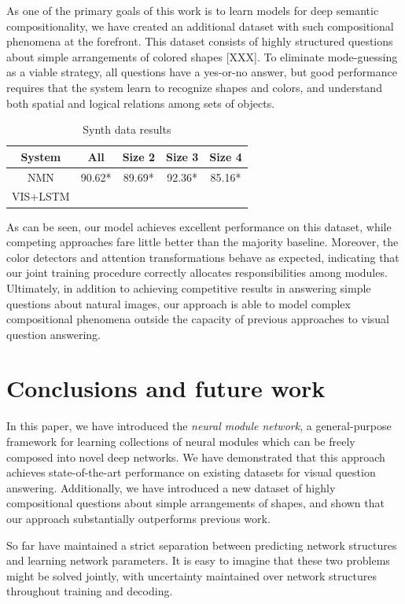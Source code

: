 \documentclass[10pt,twocolumn,letterpaper]{article}
\begin{document}
As one of the primary goals of this work is to learn models for deep semantic compositionality, we have created an additional dataset with such compositional phenomena at the forefront. This dataset consists of highly structured questions about simple arrangements of colored shapes [XXX]. To eliminate mode-guessing as a viable strategy, all questions have a yes-or-no answer, but good performance requires that the system learn to recognize shapes and colors, and understand both spatial and logical relations among sets of objects.


\begin{table}[h]
  \footnotesize
  \center
  \begin{tabular}{ccccc}
    \toprule
    System & All & Size 2 & Size 3 & Size 4 \\
    \midrule
    NMN & 90.62* & 89.69* & 92.36* & 85.16* \\
    VIS+LSTM &  \\
    \bottomrule
  \end{tabular}
  \caption{Synth data results}
\end{table}

As can be seen, our model achieves excellent performance on this dataset, while competing approaches fare little better than the majority baseline. Moreover, the color detectors and attention transformations behave as expected, indicating that our joint training procedure correctly allocates responsibilities among modules. Ultimately, in addition to achieving competitive results in answering simple questions about natural images, our approach is able to model complex compositional phenomena outside the capacity of previous approaches to visual question answering.

\section{Conclusions and future work}

In this paper, we have introduced the \emph{neural module network}, a general-purpose framework for learning collections of neural modules which can be freely composed into novel deep networks. We have demonstrated that this approach achieves state-of-the-art performance on existing datasets for visual question answering. Additionally, we have introduced a new dataset of highly compositional questions about simple arrangements of shapes, and shown that our approach substantially outperforms previous work.

So far have maintained a strict separation between predicting network
structures and learning network parameters. It is easy to imagine that these two
problems might be solved jointly, with uncertainty maintained over network
structures throughout training and decoding.
\end{document}
